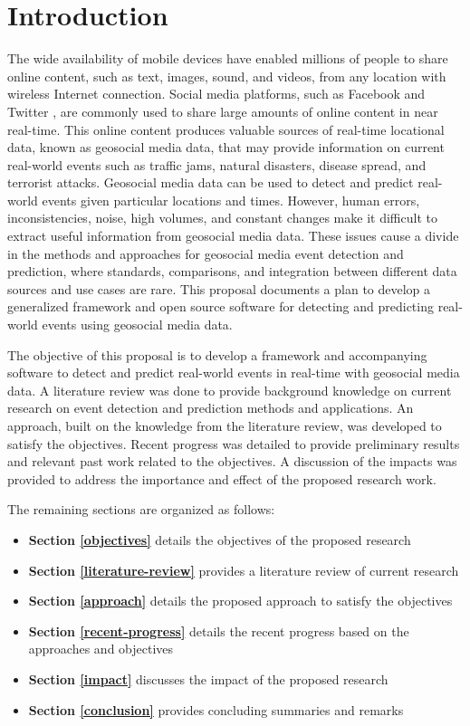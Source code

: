 



\section{Introduction} \label{introduction}

The wide availability of mobile devices have enabled millions of people to share online content, such as text, images, sound, and videos, from any location with wireless Internet connection. Social media platforms, such as Facebook \citep{Facebook:2017} and Twitter \citep{Twitter:2017}, are commonly used to share large amounts of online content in near real-time. This online content produces valuable sources of real-time locational data, known as geosocial media data, that may provide information on current real-world events such as traffic jams, natural disasters, disease spread, and terrorist attacks. Geosocial media data can be used to detect and predict real-world events given particular locations and times. However, human errors, inconsistencies, noise, high volumes, and constant changes make it difficult to extract useful information from geosocial media data. These issues cause a divide in the methods and approaches for geosocial media event detection and prediction, where standards, comparisons, and integration between different data sources and use cases are rare. This proposal documents a plan to develop a generalized framework and open source software for detecting and predicting real-world events using geosocial media data.

The objective of this proposal is to develop a framework and accompanying software to detect and predict real-world events in real-time with geosocial media data. A literature review was done to provide background knowledge on current research on event detection and prediction methods and applications. An approach, built on the knowledge from the literature review, was developed to satisfy the objectives. Recent progress was detailed to provide preliminary results and relevant past work related to the objectives. A discussion of the impacts was provided to address the importance and effect of the proposed research work.

The remaining sections are organized as follows:

\begin{itemize}
	\item \textbf{Section \ref{objectives}} details the objectives of the proposed research
	\item \textbf{Section \ref{literature-review}} provides a literature review of current research
	\item \textbf{Section \ref{approach}} details the proposed approach to satisfy the objectives
	\item \textbf{Section \ref{recent-progress}} details the recent progress based on the approaches and objectives
	\item \textbf{Section \ref{impact}} discusses the impact of the proposed research
	\item \textbf{Section \ref{conclusion}} provides concluding summaries and remarks
\end{itemize}

